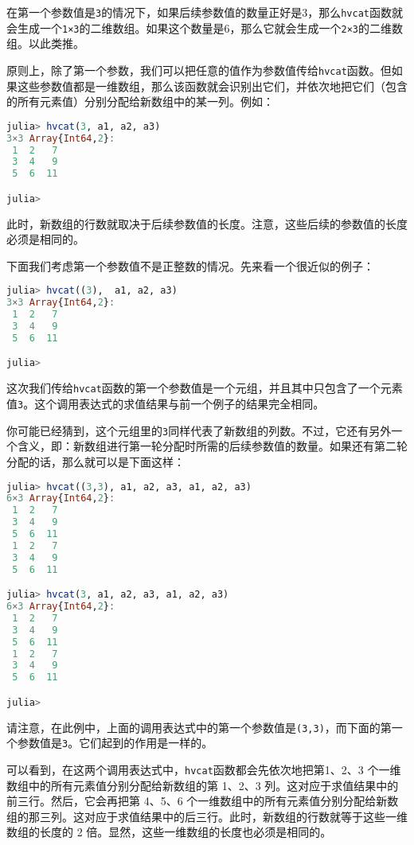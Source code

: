 在第一个参数值是\verb|3|的情况下，如果后续参数值的数量正好是3，那么\verb|hvcat|函数就会生成一个\verb|1×3|的二维数组。如果这个数量是6，那么它就会生成一个\verb|2×3|的二维数组。以此类推。

原则上，除了第一个参数，我们可以把任意的值作为参数值传给\verb|hvcat|函数。但如果这些参数值都是一维数组，那么该函数就会识别出它们，并依次地把它们（包含的所有元素值）分别分配给新数组中的某一列。例如：

\begin{lstlisting}[language=julia]
julia> hvcat(3, a1, a2, a3)
3×3 Array{Int64,2}:
 1  2   7
 3  4   9
 5  6  11

julia> 
\end{lstlisting}

此时，新数组的行数就取决于后续参数值的长度。注意，这些后续的参数值的长度必须是相同的。

下面我们考虑第一个参数值不是正整数的情况。先来看一个很近似的例子：

\begin{lstlisting}[language=julia]
julia> hvcat((3),  a1, a2, a3)
3×3 Array{Int64,2}:
 1  2   7
 3  4   9
 5  6  11

julia>
\end{lstlisting}

这次我们传给\verb|hvcat|函数的第一个参数值是一个元组，并且其中只包含了一个元素值\verb|3|。这个调用表达式的求值结果与前一个例子的结果完全相同。

你可能已经猜到，这个元组里的\verb|3|同样代表了新数组的列数。不过，它还有另外一个含义，即：新数组进行第一轮分配时所需的后续参数值的数量。如果还有第二轮分配的话，那么就可以是下面这样：

\begin{lstlisting}[language=julia]
julia> hvcat((3,3), a1, a2, a3, a1, a2, a3)
6×3 Array{Int64,2}:
 1  2   7
 3  4   9
 5  6  11
 1  2   7
 3  4   9
 5  6  11

julia> hvcat(3, a1, a2, a3, a1, a2, a3)
6×3 Array{Int64,2}:
 1  2   7
 3  4   9
 5  6  11
 1  2   7
 3  4   9
 5  6  11

julia> 
\end{lstlisting}

请注意，在此例中，上面的调用表达式中的第一个参数值是\verb|(3,3)|，而下面的第一个参数值是\verb|3|。它们起到的作用是一样的。

可以看到，在这两个调用表达式中，\verb|hvcat|函数都会先依次地把第1、2、3 个一维数组中的所有元素值分别分配给新数组的第 1、2、3 列。这对应于求值结果中的前三行。然后，它会再把第 4、5、6 个一维数组中的所有元素值分别分配给新数组的那三列。这对应于求值结果中的后三行。此时，新数组的行数就等于这些一维数组的长度的 2 倍。显然，这些一维数组的长度也必须是相同的。

